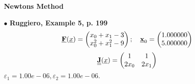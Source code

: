 \documentclass{report}[10pts]
\begin{document}
   \begin{center}
   \textbf{\Large{Newtons Method}}
   \end{center}
$\bullet$
\textbf{Ruggiero, Example 5, p. 199}
\[
   \Vector{F}(\underline{x})=
      \begin{pmatrix*}
      x_0+x_1-3 \\ x_0^2+x_1^2-9
      \end{pmatrix*}
   ;\quad
   \Vector{x}_0=
      \begin{pmatrix*}[r]
      1.000000 \\ 5.000000
      \end{pmatrix*}
\]
\[
   \Matrix{J}(\underline{x})=
      \begin{pmatrix*}
         1 & 1\\
         2x_0 & 2x_1\\
      \end{pmatrix*}
\]
$
\varepsilon_1=1.00e-06,
\varepsilon_2=1.00e-06.
$
\end{document}
